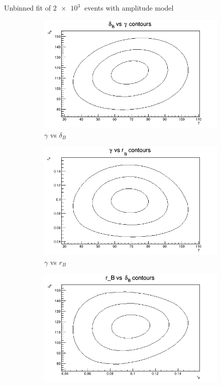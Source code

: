 \documentclass{beamer}
\begin{document}
\begin{frame}{Unbinned fit of $\SI{2e3}{}$ events with amplitude model}
  \begin{figure}
    \centering
    \vspace{-0.2cm}
    \begin{subfigure}{0.46\textwidth}
      \includegraphics[width = 1.0\textwidth]{Contour_dB_vs_gamma_1K.png}
      \caption{$\gamma$ vs $\delta_B$}
    \end{subfigure}%
    \begin{subfigure}{0.46\textwidth}
      \includegraphics[width = 1.0\textwidth]{Contour_gamma_vs_rB_1K.png}
      \caption{$\gamma$ vs $r_B$}
    \end{subfigure}
    \begin{subfigure}{0.46\textwidth}
      \includegraphics[width = 1.0\textwidth]{Contour_rB_vs_dB_1K.png}

\end{subfigure}
\end{figure}
\end{frame}
\end{document}
